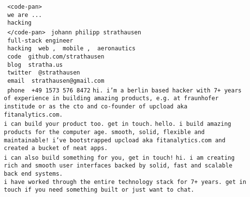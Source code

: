\documentclass[a5paper,landscape]{article}
\newcommand{\blue}[1]{\texttt{\color{Green} #1}}
\newcommand{\red}[1]{\texttt{\color{WildStrawberry} #1}}
\begin{document}
\noindent
\huge
\red{<code-pan>} \\
\blue{we are ...} \\
\blue{hacking }\\
\red{</code-pan>}
\clearpage
\noindent
\red{johann philipp strathausen} \\
\blue{full-stack engineer} \\
\blue{hacking }\red{web}\blue{, }\red{mobile}\blue{, }\red{aeronautics} \\
\red{code }\blue{github.com/strathausen} \\
\red{blog }\blue{stratha.us} \\
\red{twitter }\blue{@strathausen} \\
\red{email }\blue{strathausen@gmail.com} \\
\red{phone }\blue{+49 1573 576 8472} %
\clearpage
\pagecolor{MidnightBlue}
\color{White}
\noindent
\texttt{hi.
  i'm a berlin based hacker with
  7+ years of experience in building amazing products,
  e.g. at fraunhofer institude or
  as the cto and co-founder of upcload aka
  fitanalytics.com. \\
  i can build your product too.  get in touch.}
\newpage
\noindent
\texttt{hello. i build amazing products for the computer age.
  smooth, solid, flexible and maintainable!
  i've bootstrapped upcload aka fitanalytics.com and
  created a bucket of neat apps.\\
  i can also build something for you, get in touch!}
\newpage
\noindent
\texttt{hi. i am creating rich and smooth
  user interfaces backed by solid, fast and scalable back end
  systems.\\
  i have worked through the entire technology stack for 7+ years.
  get in touch if you need something built or just want to chat.}
\end{document}

